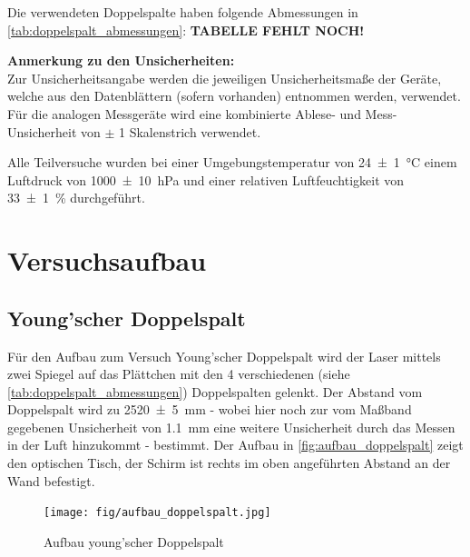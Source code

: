 \documentclass[ngerman]{scrartcl}
\begin{document}
Die verwendeten Doppelspalte haben folgende Abmessungen in \autoref{tab:doppelspalt_abmessungen}:
\textbf{TABELLE FEHLT NOCH!}

\textbf{Anmerkung zu den Unsicherheiten:}\\
Zur Unsicherheitsangabe werden die jeweiligen Unsicherheitsmaße der Geräte, welche aus den Datenblättern (sofern vorhanden) entnommen werden, verwendet. Für die analogen Messgeräte wird eine kombinierte Ablese- und Mess-Unsicherheit von $\pm$ 1 Skalenstrich verwendet.

Alle Teilversuche wurden bei einer Umgebungstemperatur von \SI{24(1)}{\celsius} einem Luftdruck von \SI{1000(10)}{\hecto\pascal} und einer relativen Luftfeuchtigkeit von \SI{33(1)}{\percent} durchgeführt.


\section{Versuchsaufbau}
\label{sec:aufbau}
\subsection{Young'scher Doppelspalt}
\label{sec:aufbau_doppelspalte}
Für den Aufbau zum Versuch Young'scher Doppelspalt wird der Laser mittels zwei Spiegel auf das Plättchen mit den 4 verschiedenen (siehe \autoref{tab:doppelspalt_abmessungen}) Doppelspalten gelenkt. Der Abstand vom Doppelspalt wird zu \SI{2520(5)}{\milli\meter} - wobei hier noch zur vom Maßband gegebenen Unsicherheit von \SI{1.1}{\milli\meter} eine weitere Unsicherheit durch das Messen in der Luft hinzukommt - bestimmt. Der Aufbau in \autoref{fig:aufbau_doppelspalt} zeigt den optischen Tisch, der Schirm ist rechts im oben angeführten Abstand an der Wand befestigt. 
\begin{figure}[H]
    \centering
    \begin{samepage}
        \texttt{[image: fig/aufbau\_doppelspalt.jpg]}
        \caption{Aufbau young'scher Doppelspalt}
        \label{fig:aufbau_doppelspalt}
    \end{samepage}
\end{figure}
\end{document}
